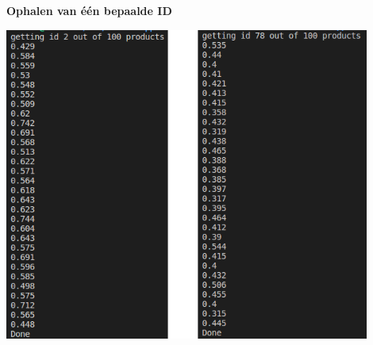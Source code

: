 \textbf{Ophalen van één bepaalde ID}
\begin{center}
	\includegraphics[width=12cm]{img/test-result-6}\\[1cm]
\end{center}